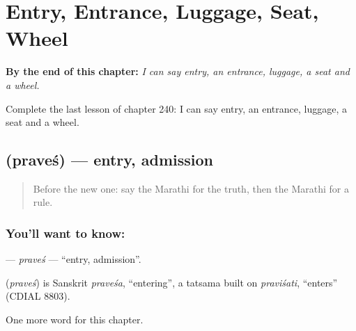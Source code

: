 
\chapter{Entry, Entrance, Luggage, Seat, Wheel}
\label{ch:mr-entry-entrance-luggage-seat-wheel}

\begin{chapteropening}
\textbf{By the end of this chapter:} \emph{I can say entry, an entrance, luggage, a seat and a wheel.}

Complete the last lesson of chapter 240: I can say entry, an entrance, luggage, a seat and a wheel.
\end{chapteropening}

\section[\texorpdfstring{\mr{प्रवेश} (praveś)}{प्रवेश (praveś)}]{ (praveś) — entry, admission}

\label{lesson:MR-C240-praves}



\begin{quote}
Before the new one: say the Marathi for the truth, then the Marathi for a rule.
\end{quote}

\subsection*{You'll want to know: }
\textbf{} — \emph{praveś} — \textquotedblleft{}entry, admission\textquotedblright{}.

\begin{cousinweb}
\textbf{} (\emph{praveś}) is Sanskrit \emph{praveśa}, \textquotedblleft{}entering\textquotedblright{}, a tatsama built on \emph{praviśati}, \textquotedblleft{}enters\textquotedblright{} (CDIAL 8803).
\end{cousinweb}

\begin{grammarlens}[title={What you've built}]
One more word for this chapter.
\end{grammarlens}

